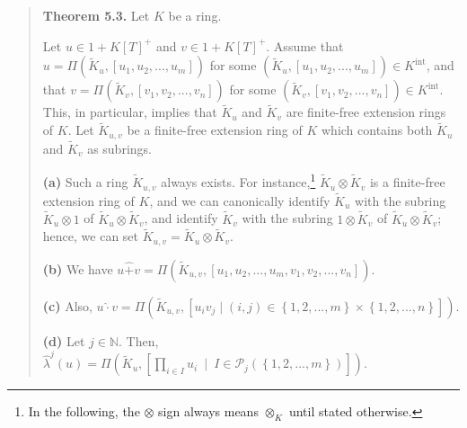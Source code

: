 \documentclass[numbers=enddot,12pt,final,onecolumn,notitlepage]{scrartcl}%
\begin{document}
\begin{quote}
\textbf{Theorem 5.3.} Let $K$ be a ring.

Let $u\in1+K\left[  T\right]  ^{+}$ and $v\in1+K\left[  T\right]  ^{+}$.
Assume that $u=\Pi\left(  \widetilde{K}_{u},\left[  u_{1},u_{2},...,u_{m}%
\right]  \right)  $ for some $\left(  \widetilde{K}_{u},\left[  u_{1}%
,u_{2},...,u_{m}\right]  \right)  \in K^{\operatorname*{int}}$, and that
$v=\Pi\left(  \widetilde{K}_{v},\left[  v_{1},v_{2},...,v_{n}\right]  \right)
$ for some $\left(  \widetilde{K}_{v},\left[  v_{1},v_{2},...,v_{n}\right]
\right)  \in K^{\operatorname*{int}}$. This, in particular, implies that
$\widetilde{K}_{u}$ and $\widetilde{K}_{v}$ are finite-free extension rings of
$K$. Let $\widetilde{K}_{u,v}$ be a finite-free extension ring of $K$ which
contains both $\widetilde{K}_{u}$ and $\widetilde{K}_{v}$ as subrings.

\textbf{(a)} Such a ring $\widetilde{K}_{u,v}$ always exists. For
instance,\footnote{In the following, the $\otimes$ sign always means
$\otimes_{K}$ until stated otherwise.} $\widetilde{K}_{u}\otimes
\widetilde{K}_{v}$ is a finite-free extension ring of $K$, and we can
canonically identify $\widetilde{K}_{u}$ with the subring $\widetilde{K}%
_{u}\otimes1$ of $\widetilde{K}_{u}\otimes\widetilde{K}_{v}$, and identify
$\widetilde{K}_{v}$ with the subring $1\otimes\widetilde{K}_{v}$ of
$\widetilde{K}_{u}\otimes\widetilde{K}_{v}$; hence, we can set $\widetilde{K}%
_{u,v}=\widetilde{K}_{u}\otimes\widetilde{K}_{v}$.

\textbf{(b)} We have $u\widehat{+}v=\Pi\left(  \widetilde{K}_{u,v},\left[
u_{1},u_{2},...,u_{m},v_{1},v_{2},...,v_{n}\right]  \right)  $.

\textbf{(c)} Also, $u\widehat{\cdot}v=\Pi\left(  \widetilde{K}_{u,v},\left[
u_{i}v_{j}\mid\left(  i,j\right)  \in\left\{  1,2,...,m\right\}
\times\left\{  1,2,...,n\right\}  \right]  \right)  $.

\textbf{(d)} Let $j\in\mathbb{N}$. Then, $\widehat{\lambda}^{j}\left(
u\right)  =\Pi\left(  \widetilde{K}_{u},\left[  \prod\limits_{i\in I}%
u_{i}\ \mid\ I\in\mathcal{P}_{j}\left(  \left\{  1,2,...,m\right\}  \right)
\right]  \right)  $.
\end{quote}
\end{document}
